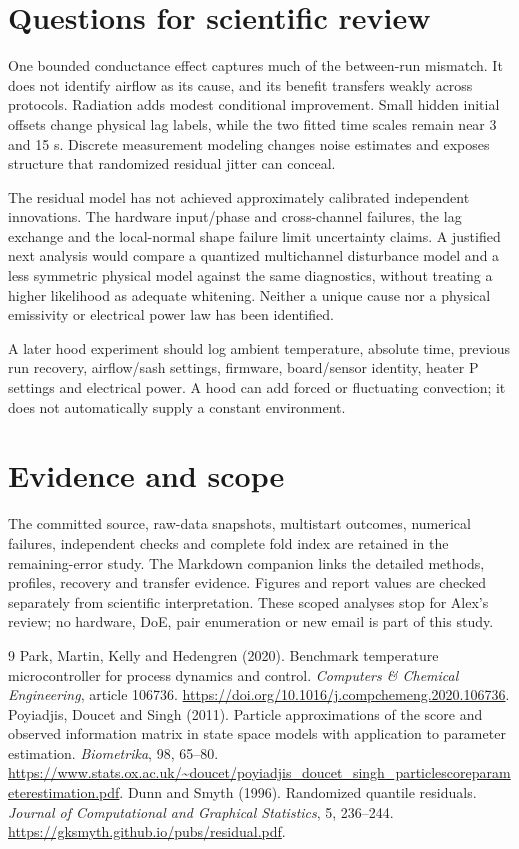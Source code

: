 \documentclass[10pt,letterpaper]{article}
\begin{document}
\section{Questions for scientific review}
One bounded conductance effect captures much of the between-run mismatch.
It does not identify airflow as its cause, and its benefit transfers weakly
across protocols. Radiation adds modest conditional improvement. Small hidden
initial offsets change physical lag labels, while the two fitted time scales
remain near 3 and 15 s. Discrete measurement modeling changes noise estimates
and exposes structure that randomized residual jitter can conceal.

The residual model has not achieved approximately calibrated independent
innovations. The hardware input/phase and cross-channel failures, the lag
exchange and the local-normal shape failure limit uncertainty claims.
A justified next analysis would compare a quantized multichannel disturbance
model and a less symmetric physical model against the same diagnostics,
without treating a higher likelihood as adequate whitening. Neither a unique
cause nor a physical emissivity or electrical power law has been identified.

A later hood experiment should log ambient temperature, absolute time,
previous run recovery, airflow/sash settings, firmware, board/sensor identity,
heater P settings and electrical power. A hood can add forced or fluctuating
convection; it does not automatically supply a constant environment.

\section*{Evidence and scope}
The committed source, raw-data snapshots, multistart outcomes, numerical
failures, independent checks and complete fold index are retained in the
remaining-error study. The Markdown companion links the detailed methods,
profiles, recovery and transfer evidence. Figures and report values are checked
separately from scientific interpretation. These scoped analyses stop for
Alex's review; no hardware, DoE, pair enumeration or new email is part of this
study.

\begin{thebibliography}{9}
Park, Martin, Kelly and Hedengren (2020).
Benchmark temperature microcontroller for process dynamics and control.
\emph{Computers \& Chemical Engineering}, article 106736.
\url{https://doi.org/10.1016/j.compchemeng.2020.106736}.
Poyiadjis, Doucet and Singh (2011).
Particle approximations of the score and observed information matrix in
state space models with application to parameter estimation.
\emph{Biometrika}, 98, 65--80.
\url{https://www.stats.ox.ac.uk/~doucet/poyiadjis_doucet_singh_particlescoreparameterestimation.pdf}.
Dunn and Smyth (1996). Randomized quantile residuals.
\emph{Journal of Computational and Graphical Statistics}, 5, 236--244.
\url{https://gksmyth.github.io/pubs/residual.pdf}.
\end{thebibliography}
\end{document}
